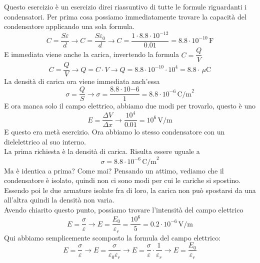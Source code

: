 Questo esercizio è un esercizio direi riassuntivo di tutte le formule riguardanti i condensatori.
Per prima cosa possiamo immediatamente trovare la capacità del condensatore applicando una sola 
formula.
\begin{equation*}
C = \frac{S\varepsilon}{d} \rightarrow C = \frac{S\varepsilon_0}{d} \rightarrow 
C = \frac{1\cdot8.8\cdot10^{-12}}{0.01} = \boxed{8.8\cdot10^{-10}\,\text{F}}
\end{equation*}
E immediata viene anche la carica, invertendo la formula $C = \dfrac{Q}{V}$
\begin{equation*}
C = \frac{Q}{V} \rightarrow Q = C\cdot V \rightarrow Q = 8.8\cdot10^{-10}\cdot10^4 = 
\boxed{8.8\cdot\,\mu\text{C}}
\end{equation*}
La densità di carica ora viene immediata anch'essa
\begin{equation*}
\sigma = \frac{Q}{S} \rightarrow \sigma = \frac{8.8\cdot10{-6}}{1} = 
\boxed{8.8\cdot10^{-6}\,\text{C/m}^2}
\end{equation*}
E ora manca solo il campo elettrico, abbiamo due modi per trovarlo, questo è uno
\begin{equation*}
E = \frac{\Delta V}{\Delta x} \rightarrow \frac{10^4}{0.01} = \boxed{10^6\,\text{V/m}}
\end{equation*}
E questo era metà esercizio. Ora abbiamo lo stesso condensatore con un dielelettrico al suo interno.\\
La prima richiesta è la densità di carica. Risulta essere uguale a
\begin{equation*}
\sigma = \boxed{8.8\cdot10^{-6}\,\text{C/m}^2}
\end{equation*}
Ma è identica a prima? Come mai? Pensando un attimo, vediamo che il condensatore è isolato, quindi non
ci sono modi per cui le cariche si spostino. Essendo poi le due armature isolate fra di loro, la
carica non può spostarsi da una all'altra quindi la densità non varia.\\
Avendo chiarito questo punto, possiamo trovare l'intensità del campo elettrico
\begin{equation*}
E = \frac{\sigma}{\varepsilon} \rightarrow E = \frac{E_0}{\varepsilon_r} = 
\frac{10^6}{5} = \boxed{0.2\cdot10^{-6}\,\text{V/m}}
\end{equation*}
Qui abbiamo semplicemente scomposto la formula del campo elettrico:
\begin{equation*}
E = \frac{\sigma}{\varepsilon} \rightarrow E = \frac{\sigma}{\varepsilon_0\varepsilon_r} \rightarrow
E = \frac{\sigma}{\varepsilon}\cdot\frac{1}{\varepsilon_r} \rightarrow E = \frac{E_0}{\varepsilon_r}
\end{equation*}
